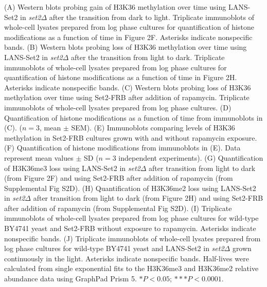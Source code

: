 \documentclass[11pt]{biorxiv}
\newcommand{\setdelt}{\emph{set2$\Delta$}\xspace}
\begin{document}
\noindent (A) Western blots probing gain of H3K36 methylation over time using LANS-Set2 in \setdelt after the transition from dark to light. Triplicate immunoblots of whole-cell lysates prepared from log phase cultures for quantification of histone modifications as a function of time in Figure 2F. Asterisks indicate nonspecific bands. (B) Western blots probing loss of H3K36 methylation over time using LANS-Set2 in \setdelt after the transition from light to dark. Triplicate immunoblots of whole-cell lysates prepared from log phase cultures for quantification of histone modifications as a function of time in Figure 2H. Asterisks indicate nonspecific bands. (C) Western blots probing loss of H3K36 methylation over time using Set2-FRB after addition of rapamycin. Triplicate immunoblots of whole-cell lysates prepared from log phase cultures. (D) Quantification of histone modifications as a function of time from immunoblots in (C). ($n = 3$, mean $\pm$ SEM). (E) Immunoblots comparing levels of H3K36 methylation in Set2-FRB cultures grown with and without rapamycin exposure. (F) Quantification of histone modifications from immunoblots in (E). Data represent mean values $\pm$ SD ($n = 3$ independent experiments). (G) Quantification of H3K36me3 loss using LANS-Set2 in \setdelt after transition from light to dark (from Figure 2F) and using Set2-FRB after addition of rapamycin (from Supplemental Fig S2D). (H) Quantification of H3K36me2 loss using LANS-Set2 in \setdelt after transition from light to dark (from Figure 2H) and using Set2-FRB after addition of rapamycin (from Supplemental Fig S2D). (I) Triplicate immunoblots of whole-cell lysates prepared from log phase cultures for wild-type BY4741 yeast and Set2-FRB without exposure to rapamycin. Asterisks indicate nonspecific bands. (J) Triplicate immunoblots of whole-cell lysates prepared from log phase cultures for wild-type BY4741 yeast and LANS-Set2 in \setdelt grown continuously in the light. Asterisks indicate nonspecific bands. Half-lives were calculated from single exponential fits to the H3K36me3 and H3K36me2 relative abundance data using GraphPad Prism 5. $*P < 0.05$; $***P < 0.0001$. 

\clearpage
\end{document}
